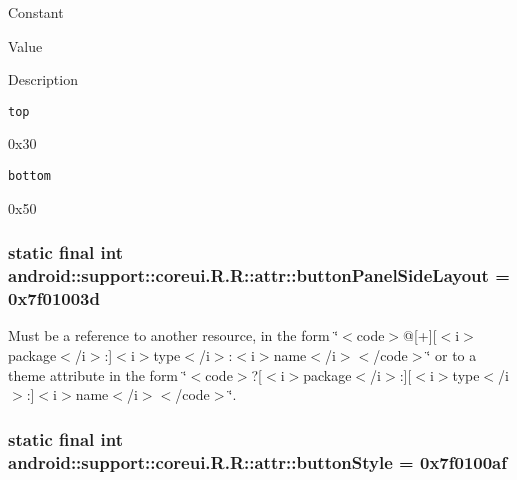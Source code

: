 Constant

Value

Description 

{\tt top}

0x30

{\tt bottom}

0x50\hypertarget{classandroid_1_1support_1_1coreui_1_1_r_1_1attr_943c67f1f692c544dfd1e8fd368514e9}{
\subsubsection[{buttonPanelSideLayout}]{\setlength{\rightskip}{0pt plus 5cm}static final int android::support::coreui.R.R::attr::buttonPanelSideLayout = 0x7f01003d}}
\label{classandroid_1_1support_1_1coreui_1_1_r_1_1attr_943c67f1f692c544dfd1e8fd368514e9}


Must be a reference to another resource, in the form \char`\"{}$<$code$>$@\mbox{[}+\mbox{]}\mbox{[}$<$i$>$package$<$/i$>$:\mbox{]}$<$i$>$type$<$/i$>$:$<$i$>$name$<$/i$>$$<$/code$>$\char`\"{} or to a theme attribute in the form \char`\"{}$<$code$>$?\mbox{[}$<$i$>$package$<$/i$>$:\mbox{]}\mbox{[}$<$i$>$type$<$/i$>$:\mbox{]}$<$i$>$name$<$/i$>$$<$/code$>$\char`\"{}. \hypertarget{classandroid_1_1support_1_1coreui_1_1_r_1_1attr_13476d7e88bbc20d99d933ed194cce71}{
\subsubsection[{buttonStyle}]{\setlength{\rightskip}{0pt plus 5cm}static final int android::support::coreui.R.R::attr::buttonStyle = 0x7f0100af}}
\label{classandroid_1_1support_1_1coreui_1_1_r_1_1attr_13476d7e88bbc20d99d933ed194cce71}


